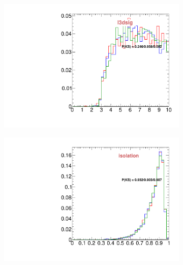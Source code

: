 \begin{figure}
\begin{subfigure}[b]{0.2\textwidth}
                \includegraphics[width=\textwidth]{Figures/VariablesComparison/MC_barrel_figs_3h/l3dsig}
                \label{fig:MC_barrel_l3dsig_3h}
        \end{subfigure}
        \begin{subfigure}[b]{0.2\textwidth}
                \centering
                \includegraphics[width=\textwidth]{Figures/VariablesComparison/MC_barrel_figs_3h/isolation}
                \label{fig:MC_barrel_isolation_3h}
        \end{subfigure}
        \begin{subfigure}[b]{0.2\textwidth}
                \centering

\end{subfigure}
\end{figure}
